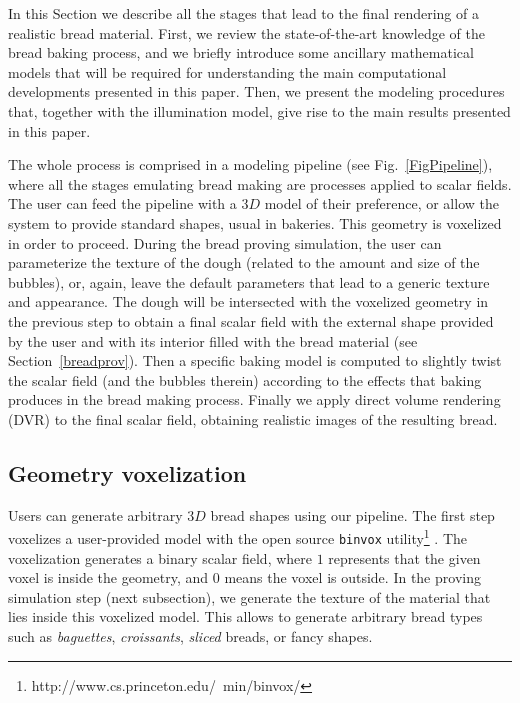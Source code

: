 In this Section we describe all the stages that lead to the final rendering of a realistic bread material.
First, we review the state-of-the-art knowledge of the bread baking process, and we briefly introduce some ancillary mathematical models that will be required for understanding the main computational developments presented in this paper. 
Then, we present the modeling procedures that, together with the illumination model, give rise to the main results presented in this paper.

The whole process is comprised in a modeling pipeline (see Fig.~\ref{FigPipeline}), where all the stages emulating bread making are processes applied to scalar fields.
The user can feed the pipeline with a $3D$ model of their preference, or allow the system to provide standard shapes, usual in bakeries.
This geometry is voxelized in order to proceed.
During the bread proving simulation, the user can parameterize the texture of the dough (related to the amount and size of the bubbles), or, again, leave the default parameters that lead to a generic texture and appearance.
The dough will be intersected with the voxelized geometry in the previous step to obtain a final scalar field with the external shape provided by the user and with its interior filled with the bread material (see Section~\ref{breadprov}). 
Then a specific baking model is computed  \cite{Powathil2004} to slightly twist the scalar field (and the bubbles therein) according to the effects that baking produces in the bread making process. 
Finally we apply direct volume rendering (DVR) \cite{Kruger2003} to the final scalar field, obtaining realistic images of the resulting bread.


\subsection{Geometry voxelization}

Users can generate arbitrary $3D$ bread shapes using our pipeline.
The first step voxelizes a user-provided model with the open source {\tt binvox} utility\footnote{http://www.cs.princeton.edu/~min/binvox/} \cite{Nooruddin2003}.
The voxelization generates a binary scalar field, where $1$ represents that the given voxel is inside the geometry, and $0$ means the voxel is outside.
In the proving simulation step (next subsection), we generate the texture of the material that lies inside this voxelized model.
This allows to generate arbitrary bread types such as {\em baguettes}, {\em croissants}, {\em sliced} breads, or fancy shapes.

